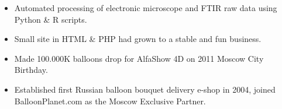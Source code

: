 \documentclass[10pt,a4paper,ragged2e]{altacv}
\begin{document}
\divider

\begin{itemize}
\item Automated processing of electronic microscope and FTIR raw data using Python \& R scripts.
\end{itemize}

\divider


\begin{itemize}
\item Small site in HTML \& PHP had grown to a stable and fun business.
\item Made 100.000K balloons drop for AlfaShow 4D on 2011 Moscow City Birthday.
\item Established first Russian balloon bouquet delivery e-shop in 2004, joined BalloonPlanet.com as the Moscow Exclusive Partner.
\end{itemize}

\clearpage
\end{document}
